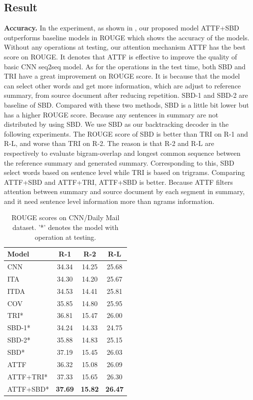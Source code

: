 \subsection{Result}
\label{sec:result}

\textbf{Accuracy.} In the experiment, as shown in , our proposed model ATTF+SBD
outperforms baseline models in ROUGE which shows the
accuracy of the models. Without any operations at testing, our attention
mechanism ATTF has the best score on ROUGE. It denotes
that ATTF is effective to improve the quality of basic CNN seq2seq model.
As for the operations in the test time, both SBD and
TRI have a great improvement on ROUGE score.
It is because that the model can select other words and get more information,
which are adjust to reference summary, from source 
document after reducing repetition.
SBD-1 and SBD-2 are baseline of SBD.
Compared with these two methods, SBD is a little bit lower
but has a higher ROUGE score.
Because any sentences in summary are not distributed by using SBD.
We use SBD as our backtracking decoder in the following experiments.
The ROUGE score of SBD 
is better than TRI on R-1 and R-L, and worse than TRI on R-2. 
The reason is that R-2 and R-L are respectively to evaluate
bigram-overlap and longest common sequence between the reference
summary and generated summary. Corresponding to this, 
SBD select words
based on sentence level while TRI is based on trigrams.
Comparing ATTF+SBD and ATTF+TRI, ATTF+SBD is better. 
Because ATTF filters attention between summary and source document
by each segment in summary, and it need sentence level 
information more than 
ngrams information. 

\begin{table}[th]
	\centering
	\scriptsize
	\begin{tabular}{|l|c|c|c|}
		\hline
		Model &   R-1 & R-2 & R-L \\
		\hline
		CNN &  34.34 & 14.25 & 25.68 \\
		ITA &  34.30 & 14.20 & 25.67 \\
		ITDA & 34.53 & 14.41 &  25.81 \\
	    COV	& 35.85 & 14.80 &  25.95 \\
        TRI* & 36.81 & 15.47 & 26.00 \\
		\hline
		SBD-1* & 34.24 & 14.33 & 24.75 \\
		SBD-2* & 35.88 & 14.83 & 25.15 \\
		SBD* & 37.19 & 15.45 & 26.03 \\
		ATTF & 36.32 & 15.08 & 26.09 \\
		ATTF+TRI* & 37.33 & 15.65 & 26.30 \\
		ATTF+SBD* & \bf 37.69 & \bf 15.82 & \bf 26.47 \\
		\hline
	\end{tabular}
	\caption{ROUGE scores on CNN/Daily Mail dataset. '*' denotes the model with operation at testing.}
	\label{tab:eval_main}
\end{table}

